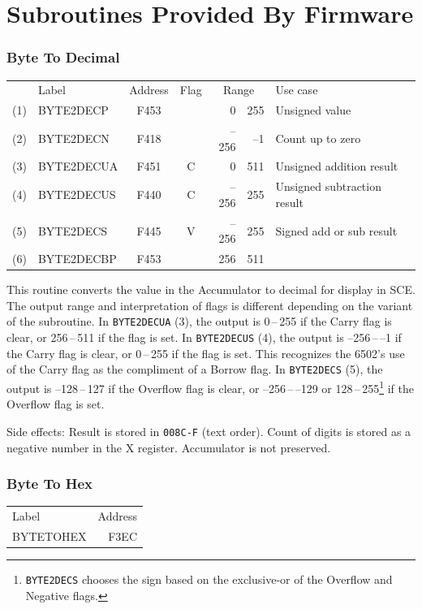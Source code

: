 \documentclass[12pt]{{memoir}}
\newcommand\fwsubroutinehdr[1]{%
\filbreak
\subsubsection{#1}}
\begin{document}
\section{Subroutines Provided By Firmware}

\fwsubroutinehdr{Byte To Decimal}

\begin{center}\begin{tabular}{r>{\ttfamily}l>{\ttfamily}ccr@{\,--\,}rl}
& \textrm{Label} & \textrm{Address} & Flag & \multicolumn{2}{c}{\phantom{--}Range} & Use case \\
(1) & BYTE2DECP & F453 & & 0&255 & Unsigned value \\
(2) & BYTE2DECN & F418 & & --256&--1 & Count up to zero \\
(3) & BYTE2DECUA & F451 & C & 0&511 & Unsigned addition result \\
(4) & BYTE2DECUS & F440 & C & --256&255 & Unsigned subtraction result \\
(5) & BYTE2DECS & F445 & V & --256&255 & Signed add or sub result \\
(6) & BYTE2DECBP & F453 & & 256&511 \\
\end{tabular}\end{center}

This routine converts the value in the Accumulator to decimal for display in SCE. The output range and interpretation of flags is different depending on the variant of the subroutine. In \texttt{BYTE2DECUA} (3), the output is 0\,--\,255 if the Carry flag is clear, or 256\,--\,511 if the flag is set. In \texttt{BYTE2DECUS} (4), the output is --256\,--\,--1 if the Carry flag is clear, or 0\,--\,255 if the flag is set. This recognizes the 6502's use of the Carry flag as the compliment of a Borrow flag. In \texttt{BYTE2DECS} (5), the output is --128\,--\,127 if the Overflow flag is clear, or --256\,--\,--129 or 128\,--\,255\footnote{\texttt{BYTE2DECS} chooses the sign based on the exclusive-or of the Overflow and Negative flags.} if the Overflow flag is set.

Side effects: Result is stored in \texttt{008C-F} (text order). Count of digits is stored as a negative number in the X register. Accumulator is not preserved.

\fwsubroutinehdr{Byte To Hex}

\begin{center}\begin{tabular}{>{\ttfamily}l>{\ttfamily}r}
\textrm{Label} & \textrm{Address} \\
BYTETOHEX & F3EC \\
\end{tabular}\end{center}
\end{document}
